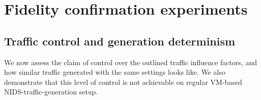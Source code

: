 \documentclass[sigconf]{acmart}
\begin{document}






\section{Fidelity confirmation experiments}\label{Sec:Experiments}




\subsection{Traffic control and generation determinism}
We now assess the claim of control over the outlined traffic influence factors, and how similar traffic generated with the same settings looks like. We also demonstrate that this level of control is not achievable on regular VM-based NIDS-traffic-generation setup.
\end{document}
